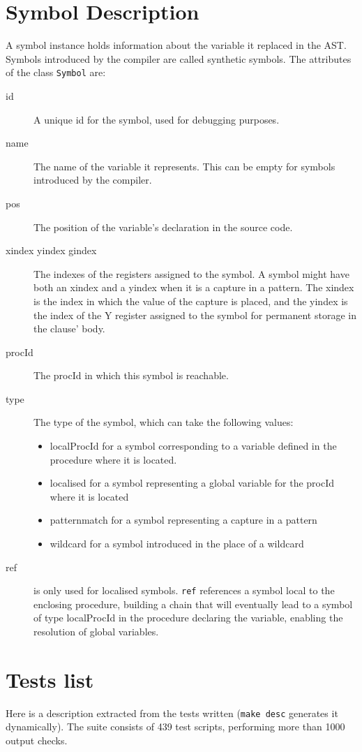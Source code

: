 \documentclass[a4paper]{memoir}
\begin{document}
\begin{appendices}
\chapter{Symbol Description}\label{appendix:symbol}
A symbol instance holds information about the variable it replaced in the AST. Symbols introduced by the compiler are called synthetic symbols.
The attributes of the class \lstinline!Symbol! are:
\begin{description}
  \item[id] A unique id for the symbol, used for debugging purposes.
  \item[name] The name of the variable it represents. This can be empty for symbols introduced by the compiler.
  \item[pos] The position of the variable's declaration in the source code.
  \item[xindex yindex gindex] The indexes of the registers assigned to the symbol. A symbol might have both an xindex and a yindex when it is a capture in a pattern. The xindex is the index in which the value of the capture is placed, and the yindex is the index of the Y register assigned to the symbol for permanent storage in the clause' body.
  \item[procId] The procId in which this symbol is reachable.
  \item[type] The type of the symbol, which can take the following values:
    \begin{itemize}
      \item localProcId for a symbol corresponding to a variable defined in the procedure where it is located.
      \item localised for a symbol representing a global variable for the procId where it is located
      \item patternmatch for a symbol representing a capture in a pattern
      \item wildcard for a symbol introduced in the place of a wildcard
    \end{itemize}
  \item[ref] is only used for localised symbols. \lstinline!ref! references a symbol local to the enclosing procedure, building a chain that will eventually lead to a symbol of type localProcId in the procedure declaring the variable, enabling the resolution of global variables.
\end{description}

\chapter{Tests list}
Here is a description extracted from the tests written (\lstinline!make desc!
generates it dynamically).
The suite consists of 439 test scripts, performing more than 1000 output
checks.


\end{appendices}
\end{document}
